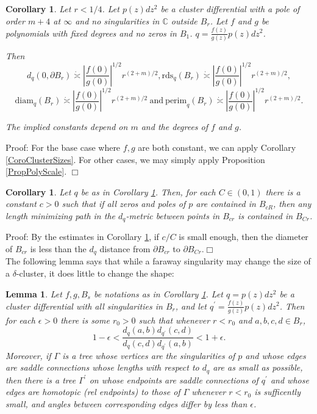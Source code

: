 \documentclass[12pt]{article}
\newtheorem{lemma}[theorem]{Lemma}
\newtheorem{corollary}[theorem]{Corollary}
\newcommand{\cc}{\mathbb{C}}
\newcommand{\diam}{\mathrm{diam}}
\newcommand{\perim}{\mathrm{perim}}
\newcommand{\rds}{\mathrm{rds}}
\begin{document}
\begin{corollary}\label{CoroBallsizes} Let $r < 1/4$. Let $p(z)dz^2$ be a cluster differential with a pole of order $m+4$ at $\infty$ and no singularities in $\cc$ outside $B_r$. Let $f$ and $g$ be polynomials with fixed degrees and no zeros in $B_1$. $q = \frac{f(z)}{g(z)}p(z)dz^2$.

Then $$d_q(0,\partial B_r) \dot{\asymp} \left|\frac{f(0)}{g(0)}\right|^{1/2}r^{(2+m)/2}, \rds_q(B_r) \dot{\asymp} \left|\frac{f(0)}{g(0)}\right|^{1/2}r^{(2+m)/2},$$ $$\diam_q(B_r) \dot{\asymp} \left|\frac{f(0)}{g(0)}\right|^{1/2}r^{(2+m)/2}\mathrm{~and~}\perim_q(B_r) \dot{\asymp} \left|\frac{f(0)}{g(0)}\right|^{1/2}r^{(2+m)/2}.$$

The implied constants depend on $m$ and the degrees of $f$ and $g$.\end{corollary}

\noindent Proof: For the base case where $f,g$ are both constant, we can apply Corollary \ref{CoroClusterSizes}. For other cases, we may simply apply Proposition \ref{PropPolyScale}. $\Box$\\

\begin{corollary}\label{CoroDontleave} Let $q$ be as in Corollary \ref{CoroBallsizes}. Then, for each $C \in (0,1)$ there is a constant $c > 0$ such that if all zeros and poles of $p$ are contained in $B_{cR}$, then any length minimizing path in the $d_q$-metric between points in $B_{cr}$ is contained in $B_{Cr}$.\end{corollary}

\noindent Proof: By the estimates in Corollary \ref{CoroBallsizes}, if $c/C$ is small enough, then the diameter of $B_{cr}$ is less than the $d_q$ distance from $\partial B_{cr}$ to $\partial B_{Cr}. \Box$\\

\noindent The following lemma says that while a faraway singularity may change the size of a $\delta$-cluster, it does little to change the shape:\\

\begin{lemma}\label{LemOutsiders} Let $f,g,B_s$ be notations as in Corollary \ref{CoroBallsizes}. Let $q = p(z)dz^2$ be a cluster differential with all singularities in $B_r$, and let $q^{\prime} = \frac{f(z)}{g(z)}p(z)dz^2$. Then for each $\epsilon > 0$ there is some $r_0 > 0$ such that whenever $r < r_0$ and $a,b,c,d \in B_r$, $$1 - \epsilon < \frac{d_q(a,b)d_{q^\prime}(c,d)}{d_q(c,d)d_{q^\prime}(a,b)} < 1+\epsilon.$$ Moreover, if $\Gamma$ is a tree whose vertices are the singularities of $p$ and whose edges are saddle connections whose lengths with respect to $d_q$ are as small as possible, then there is a tree $\Gamma^\prime$ on whose endpoints are saddle connections of $q^\prime$ and whose edges are homotopic (rel endpoints) to those of $\Gamma$ whenever $r < r_0$ is sufficently small, and angles between corresponding edges differ by less than $\epsilon$. \end{lemma}
\end{document}
